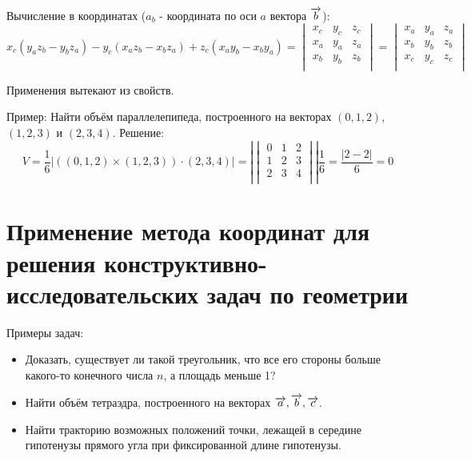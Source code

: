 \documentclass[12pt]{article}
\begin{document}
\begin{sloppypar}
    Вычисление в координатах ($a_b$ - координата по оси $a$ вектора $\overrightarrow{b}$):
    \[
        x_c (y_a z_b - y_b z_a) - y_c (x_a z_b - x_b z_a) + z_c (x_a y_b - x_b y_a) = \begin{vmatrix}
            x_c & y_c & z_c \\
            x_a & y_a & z_a \\
            x_b & y_b & z_b \\
        \end{vmatrix}
        =
        \begin{vmatrix}
            x_a & y_a & z_a \\
            x_b & y_b & z_b \\
            x_c & y_c & z_c \\
        \end{vmatrix}
    \]

    Применения вытекают из свойств.

    Пример:
    Найти объём параллелепипеда, построенного на векторах $(0, 1, 2)$, $(1, 2, 3)$ и $(2, 3, 4)$. Решение:
    \[
        V = \dfrac{1}{6}|((0, 1, 2) \times (1, 2, 3)) \cdot (2, 3, 4)| = \left|\begin{vmatrix}
            0 & 1 & 2 \\
            1 & 2 & 3 \\
            2 & 3 & 4 \\
        \end{vmatrix}\right|
        \dfrac{1}{6}
        = \dfrac{|2 - 2|}{6} = 0
    \]

    \section{Применение метода координат для решения конструктивно-исследовательских задач по геометрии}
    Примеры задач:
    \begin{itemize}
        \item Доказать, существует ли такой треугольник, что все его стороны больше какого-то конечного числа $n$, а площадь меньше 1?
        \item Найти объём тетраэдра, построенного на векторах $\overrightarrow{a}, \overrightarrow{b}, \overrightarrow{c}$.
        \item Найти тракторию возможных положений точки, лежащей в середине гипотенузы прямого угла при фиксированной длине гипотенузы.
    \end{itemize}


\end{sloppypar}
\end{document}
